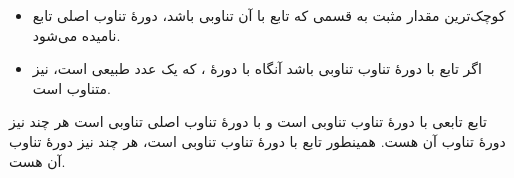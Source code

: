 \EMhold


\begin{EMunit}



\begin{itemize}
\tightlist
\item
  کوچک‌ترین مقدار مثبت  به قسمی که تابع با آن تناوبی باشد، دورهٔ تناوب اصلی تابع نامیده می‌شود.
\item
  اگر تابع با دورهٔ تناوب  تناوبی باشد آنگاه با دورهٔ ، که  یک عدد طبیعی است، نیز متناوب است.
\end{itemize}

\end{EMunit}

\EMhold


\begin{EMexample}{}

تابع  تابعی با دورهٔ تناوب \EMim{2\pi} تناوبی است و  با دورهٔ تناوب اصلی \EMim{\pi} تناوبی است هر چند \EMim{2\pi} نیز دورهٔ تناوب آن هست. همینطور تابع  با دورهٔ تناوب  تناوبی است، هر چند \EMim{2\pi} نیز دورهٔ تناوب آن هست.

\end{EMexample}

\begin{EMunit}


\end{EMunit}

\EMhold


